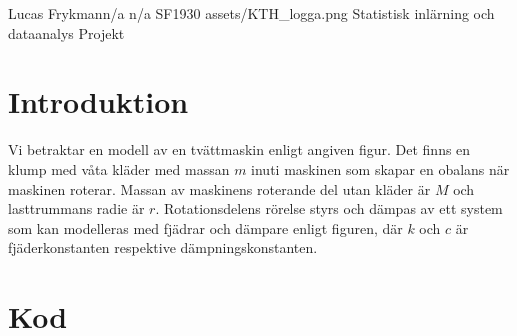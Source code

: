 \documentclass{assignment}
\begin{document}
\assignmentTitle
{Lucas Frykman}{n/a}
{n/a}
{SF1930}
{assets/KTH_logga.png}
{Statistisk inlärning och dataanalys}
{Projekt}

\section{Introduktion}

Vi betraktar en modell av en tvättmaskin enligt angiven figur. 
Det finns en klump med våta kläder med massan $m$ inuti maskinen som skapar en obalans när maskinen roterar. 
Massan av maskinens roterande del utan kläder är $M$ och lasttrummans radie är $r$. 
Rotationsdelens rörelse styrs och dämpas av ett system som kan modelleras med fjädrar och dämpare enligt figuren, där $k$ och $c$ är fjäderkonstanten respektive dämpningskonstanten.


\section{Kod}
 
\end{document}
